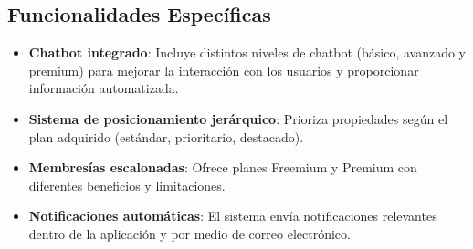 	\subsection*{Funcionalidades Específicas}
		\begin{itemize}
			\item \textbf{Chatbot integrado}: Incluye distintos niveles de chatbot (básico, avanzado y premium) para mejorar la interacción con los usuarios y proporcionar información automatizada.
			\item \textbf{Sistema de posicionamiento jerárquico}: Prioriza propiedades según el plan adquirido (estándar, prioritario, destacado).
			\item \textbf{Membresías escalonadas}: Ofrece planes Freemium y Premium con diferentes beneficios y limitaciones.
			\item \textbf{Notificaciones automáticas}: El sistema envía notificaciones relevantes dentro de la aplicación y por medio de correo electrónico.
		\end{itemize}
